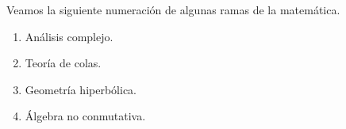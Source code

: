\documentclass{article}
\begin{document}
Veamos la siguiente numeración de algunas ramas de la matemática.
\begin{enumerate}[label={\alph*)}]
	\item Análisis complejo.

	\item Teoría de colas.

	\item Geometría hiperbólica.

	\item Álgebra no conmutativa.
\end{enumerate}
\end{document}
